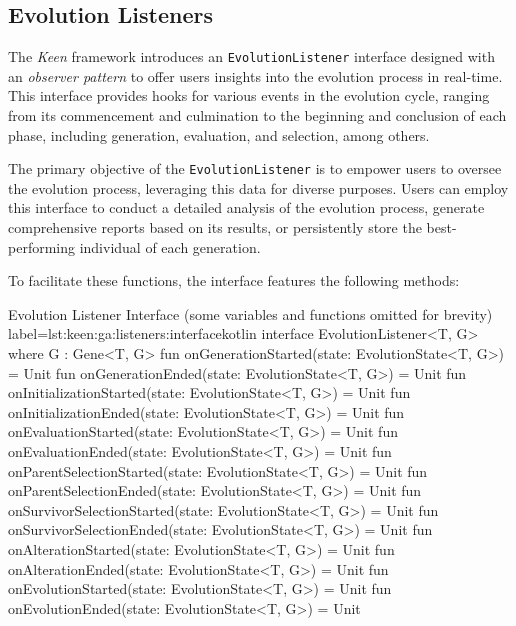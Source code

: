 \subsection{Evolution Listeners}
\label{sec:keen:ga:listeners}

  The \textit{Keen} framework introduces an \texttt{EvolutionListener} 
  interface designed with an \textit{observer pattern} to offer users insights 
  into the evolution process in real-time.
  This interface provides hooks for various events in the evolution cycle, 
  ranging from its commencement and culmination to the beginning and conclusion 
  of each phase, including generation, evaluation, and selection, among others.

  The primary objective of the \texttt{EvolutionListener} is to empower users 
  to oversee the evolution process, leveraging this data for diverse purposes. 
  Users can employ this interface to conduct a detailed analysis of the 
  evolution process, generate comprehensive reports based on its results, or 
  persistently store the best-performing individual of each generation.

  To facilitate these functions, the interface features the following methods:

  \begin{code}{
    Evolution Listener Interface (some variables and functions omitted for 
    brevity)
  }{label=lst:keen:ga:listeners:interface}{kotlin}
    interface EvolutionListener<T, G> where G : Gene<T, G> {
        fun onGenerationStarted(state: EvolutionState<T, G>) = Unit
        fun onGenerationEnded(state: EvolutionState<T, G>) = Unit
        fun onInitializationStarted(state: EvolutionState<T, G>) = Unit
        fun onInitializationEnded(state: EvolutionState<T, G>) = Unit
        fun onEvaluationStarted(state: EvolutionState<T, G>) = Unit
        fun onEvaluationEnded(state: EvolutionState<T, G>) = Unit
        fun onParentSelectionStarted(state: EvolutionState<T, G>) = Unit
        fun onParentSelectionEnded(state: EvolutionState<T, G>) = Unit
        fun onSurvivorSelectionStarted(state: EvolutionState<T, G>) = Unit
        fun onSurvivorSelectionEnded(state: EvolutionState<T, G>) = Unit
        fun onAlterationStarted(state: EvolutionState<T, G>) = Unit
        fun onAlterationEnded(state: EvolutionState<T, G>) = Unit
        fun onEvolutionStarted(state: EvolutionState<T, G>) = Unit
        fun onEvolutionEnded(state: EvolutionState<T, G>) = Unit
    }
  \end{code}

